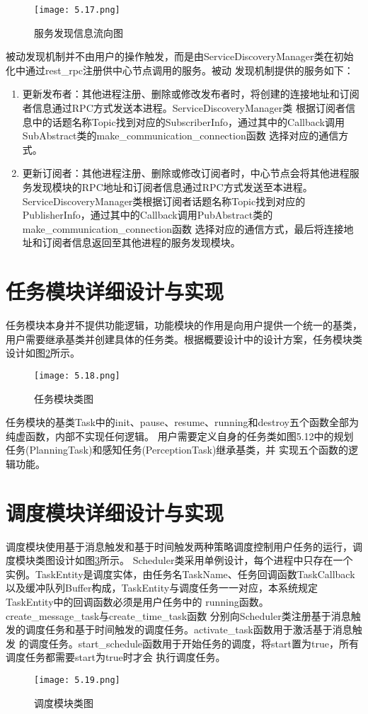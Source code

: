 \begin{figure}[H]
  \centering
  \texttt{[image: 5.17.png]}
  \caption{服务发现信息流向图}
  \label{service_discovery_message_flow}
\end{figure}

被动发现机制并不由用户的操作触发，而是由ServiceDiscoveryManager类在初始化中通过rest\_rpc注册供中心节点调用的服务。被动
发现机制提供的服务如下：
\begin{enumerate}
  \item 更新发布者：其他进程注册、删除或修改发布者时，将创建的连接地址和订阅者信息通过RPC方式发送本进程。ServiceDiscoveryManager类
  根据订阅者信息中的话题名称Topic找到对应的SubscriberInfo，通过其中的Callback调用SubAbstract类的make\_communication\_connection函数
  选择对应的通信方式。
  \item 更新订阅者：其他进程注册、删除或修改订阅者时，中心节点会将其他进程服务发现模块的RPC地址和订阅者信息通过RPC方式发送至本进程。
  ServiceDiscoveryManager类根据订阅者话题名称Topic找到对应的PublisherInfo，通过其中的Callback调用PubAbstract类的make\_communication\_connection函数
  选择对应的通信方式，最后将连接地址和订阅者信息返回至其他进程的服务发现模块。
\end{enumerate}

\section{任务模块详细设计与实现}
任务模块本身并不提供功能逻辑，功能模块的作用是向用户提供一个统一的基类，
用户需要继承基类并创建具体的任务类。根据概要设计中的设计方案，任务模块类设计如图\ref{task_class}所示。
\begin{figure}[H]
  \centering
  \texttt{[image: 5.18.png]}
  \caption{任务模块类图}
  \label{task_class}
\end{figure}
任务模块的基类Task中的init、pause、resume、running和destroy五个函数全部为纯虚函数，内部不实现任何逻辑。
用户需要定义自身的任务类如图5.12中的规划任务(PlanningTask)和感知任务(PerceptionTask)继承基类，并
实现五个函数的逻辑功能。

\section{调度模块详细设计与实现}
调度模块使用基于消息触发和基于时间触发两种策略调度控制用户任务的运行，调度模块类图设计如图\ref{schedul_class}所示。
Scheduler类采用单例设计，每个进程中只存在一个实例。TaskEntity是调度实体，由任务名TaskName、任务回调函数TaskCallback
以及缓冲队列Buffer构成，TaskEntity与调度任务一一对应，本系统规定TaskEntity中的回调函数必须是用户任务中的
running函数。
create\_message\_task与create\_time\_task函数
分别向Scheduler类注册基于消息触发的调度任务和基于时间触发的调度任务。activate\_task函数用于激活基于消息触发
的调度任务。start\_schedule函数用于开始任务的调度，将start置为true，所有调度任务都需要start为true时才会
执行调度任务。
\begin{figure}[H]
  \centering
  \texttt{[image: 5.19.png]}
  \caption{调度模块类图}
  \label{schedul_class}
\end{figure}

